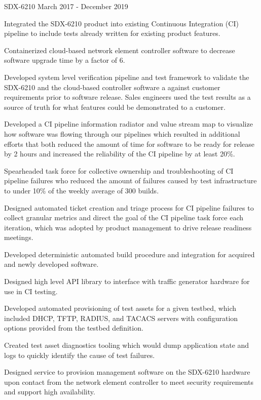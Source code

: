 \begin{cventries}
  \cventry
    {} {SDX-6210} {} {March 2017 - December 2019} {
      \begin{cvitems} %
        \item {Integrated the SDX-6210 product into existing Continuous Integration (CI) pipeline to include tests already written for existing product features.}
        \item {Containerized cloud-based network element controller software to decrease software upgrade time by a factor of 6.}
        \item {Developed system level verification pipeline and test framework to validate the SDX-6210 and the cloud-based controller software a against customer requirements prior to software release. Sales engineers used the test results as a source of truth for what features could be demonstrated to a customer.}
        \item {Developed a CI pipeline information radiator and value stream map to visualize how software was flowing through our pipelines which resulted in additional efforts that both reduced the amount of time for software to be ready for release by 2 hours and increased the reliability of the CI pipeline by at least 20\%.}
        \item {Spearheaded task force for collective ownership and troubleshooting of CI pipeline failures who reduced the amount of failures caused by test infrastructure to under 10\% of the weekly average of 300 builds.}
        \item {Designed automated ticket creation and triage process for CI pipeline failures to collect granular metrics and direct the goal of the CI pipeline task force each iteration, which was adopted by product management to drive release readiness meetings.}
        \item {Developed deterministic automated build procedure and integration for acquired and newly developed software.}
        \item {Designed high level API library to interface with traffic generator hardware for use in CI testing.}
        \item {Developed automated provisioning of test assets for a given testbed, which included DHCP, TFTP, RADIUS, and TACACS servers with configuration options provided from the testbed definition.}
        \item {Created test asset diagnostics tooling which would dump application state and logs to quickly identify the cause of test failures.}
        \item {Designed service to provision management software on the SDX-6210 hardware upon contact from the network element controller to meet security requirements and support high availability.}

\end{cvitems}}
\end{cventries}
